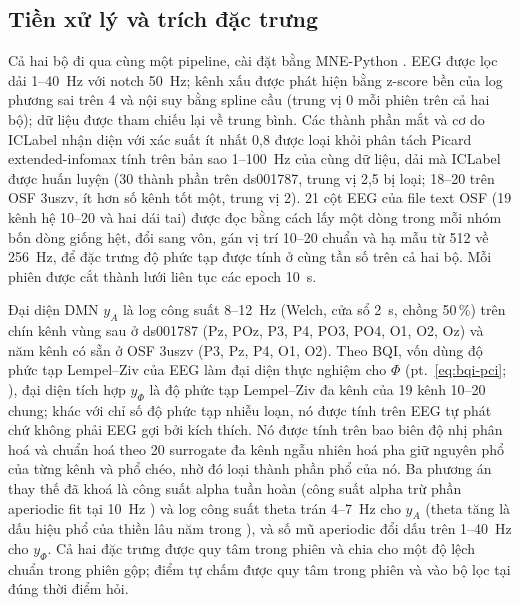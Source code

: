 \subsection{Tiền xử lý và trích đặc trưng}
\label{sec:prep}
Cả hai bộ đi qua cùng một pipeline, cài đặt bằng MNE-Python \cite{Gramfort2013}. EEG được lọc dải 1--40~Hz với notch 50~Hz; kênh xấu được phát hiện bằng z-score bền của log phương sai trên 4 và nội suy bằng spline cầu (trung vị 0 mỗi phiên trên cả hai bộ); dữ liệu được tham chiếu lại về trung bình. Các thành phần mắt và cơ do ICLabel \cite{PionTonachini2019} nhận diện với xác suất ít nhất 0,8 được loại khỏi phân tách Picard extended-infomax \cite{Ablin2018} tính trên bản sao 1--100~Hz của cùng dữ liệu, dải mà ICLabel được huấn luyện (30 thành phần trên ds001787, trung vị 2,5 bị loại; 18--20 trên OSF 3uszv, ít hơn số kênh tốt một, trung vị 2). 21 cột EEG của file text OSF (19 kênh hệ 10--20 và hai dái tai) được đọc bằng cách lấy một dòng trong mỗi nhóm bốn dòng giống hệt, đổi sang vôn, gán vị trí 10--20 chuẩn và hạ mẫu từ 512 về 256~Hz, để đặc trưng độ phức tạp được tính ở cùng tần số trên cả hai bộ. Mỗi phiên được cắt thành lưới liên tục các epoch 10~s.

Đại diện DMN $y_A$ là log công suất 8--12~Hz (Welch, cửa sổ 2~s, chồng 50\,\%) trên chín kênh vùng sau ở ds001787 (Pz, POz, P3, P4, PO3, PO4, O1, O2, Oz) và năm kênh có sẵn ở OSF 3uszv (P3, Pz, P4, O1, O2). Theo BQI, vốn dùng độ phức tạp Lempel--Ziv của EEG làm đại diện thực nghiệm cho $\Phi$ (pt.~\eqref{eq:bqi-pci}; \cite[Mục~6.3, pt.~(49)]{BQI}), đại diện tích hợp $y_\Phi$ là độ phức tạp Lempel--Ziv đa kênh \cite{Schartner2015} của 19 kênh 10--20 chung; khác với chỉ số độ phức tạp nhiễu loạn, nó được tính trên EEG tự phát chứ không phải EEG gợi bởi kích thích. Nó được tính trên bao biên độ nhị phân hoá và chuẩn hoá theo 20 surrogate đa kênh ngẫu nhiên hoá pha giữ nguyên phổ của từng kênh và phổ chéo, nhờ đó loại thành phần phổ của nó. Ba phương án thay thế đã khoá là công suất alpha tuần hoàn (công suất alpha trừ phần aperiodic fit tại 10~Hz \cite{Donoghue2020}) và log công suất theta trán 4--7~Hz cho $y_A$ (theta tăng là dấu hiệu phổ của thiền lâu năm trong \cite[Phụ lục~B.2]{BQI}), và số mũ aperiodic đổi dấu trên 1--40~Hz cho $y_\Phi$. Cả hai đặc trưng được quy tâm trong phiên và chia cho một độ lệch chuẩn trong phiên gộp; điểm tự chấm được quy tâm trong phiên và vào bộ lọc tại đúng thời điểm hỏi.

